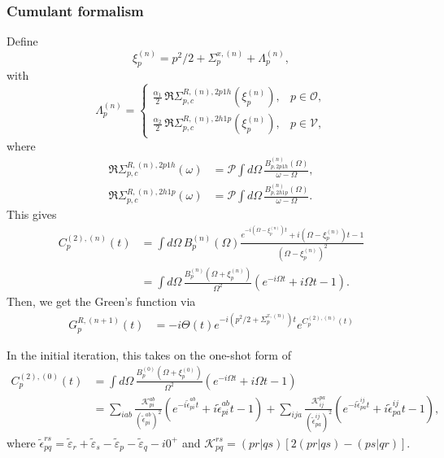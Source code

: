 \subsubsection{Cumulant formalism }
Define 
\begin{equation}
    \xi_p^{(n)}
    =
p^2/2 + \Sigma_p^{x,{(n)}} + \Lambda_p^{(n)},
\end{equation}
with
\begin{equation}
\Lambda_p^{(n)}
=
\begin{cases}
\displaystyle
\frac{\alpha_1}{2}\,
\Re\Sigma_{p,c}^{R,(n),2p1h}
\!\left(\xi_p^{(n)}\right),
& p\in\mathcal O,
\\[3mm]
\displaystyle
\frac{\alpha_2}{2}\,
\Re\Sigma_{p,c}^{R,(n),2h1p}
\!\left(\xi_p^{(n)}\right),
& p\in\mathcal V,
\end{cases}
\end{equation}
where
\begin{align}
\Re\Sigma_{p,c}^{R,(n),2p1h}(\omega)
&=
\mathcal{P}\!\int d\Omega\,
\frac{B_{p,2p1h}^{(n)}(\Omega)}
{\omega-\Omega},
\\
\Re\Sigma_{p,c}^{R,(n),2h1p}(\omega)
&=
\mathcal{P}\!\int d\Omega\,
\frac{B_{p,2h1p}^{(n)}(\Omega)}
{\omega-\Omega}.
\end{align}
This gives 
\begin{align}
C_p^{(2),(n)}(t)
&=
\int d\Omega\,
B_p^{(n)}(\Omega)
\frac{
e^{-i(\Omega-\xi_p^{(n)})t}
+i(\Omega-\xi_p^{(n)})t
-1
}{
(\Omega-\xi_p^{(n)})^2
}\\
&= \int d\Omega\,\frac{B_p^{(n)}(\Omega + \xi_p^{(n)})}{\Omega^2}
\left(
e^{-i\Omega t}
+i\Omega t
-1
\right).
\end{align}
Then, we get the Green's function via 
\begin{align}
G_p^{R,(n+1)}(t)
&=
-i\Theta(t)
e^{-i(p^2/2+\Sigma_p^{x,{(n)}})t}
e^{C_p^{(2),(n)}(t)}
\end{align}
\begin{tcolorbox}
    In the initial iteration, this takes on the one-shot form of 
\begin{align}
C_p^{(2),(0)}(t)
&= \int d\Omega\,\frac{B_p^{(0)}(\Omega+\xi_p^{(0)})}{\Omega^2}
\left(e^{-i\Omega t}+i\Omega t-1
\right)
\\
&=
\sum_{iab}\frac{\mathcal K_{pi}^{ab}}{(\tilde{\epsilon}_{pi}^{ab})^2}
\left(e^{-i\tilde{\epsilon}_{pi}^{ab} t}+i\tilde{\epsilon}_{pi}^{ab} t-1\right)
+
\sum_{ija}\frac{\mathcal K_{ij}^{pa}}{(\tilde{\epsilon}_{pa}^{ij})^2}
\left(e^{-i\tilde{\epsilon}_{pa}^{ij} t}+i\tilde{\epsilon}_{pa}^{ij} t-1\right),
\end{align}
where $\tilde{\epsilon}_{pq}^{rs} = \tilde{\varepsilon}_r + \tilde{\varepsilon}_s - \tilde{\varepsilon}_p - \tilde{\varepsilon}_q - i0^+$ and $\mathcal{K}_{pq}^{rs}=(pr|qs)\left[2(pr|qs)-(ps|qr)\right]$.
\end{tcolorbox}
